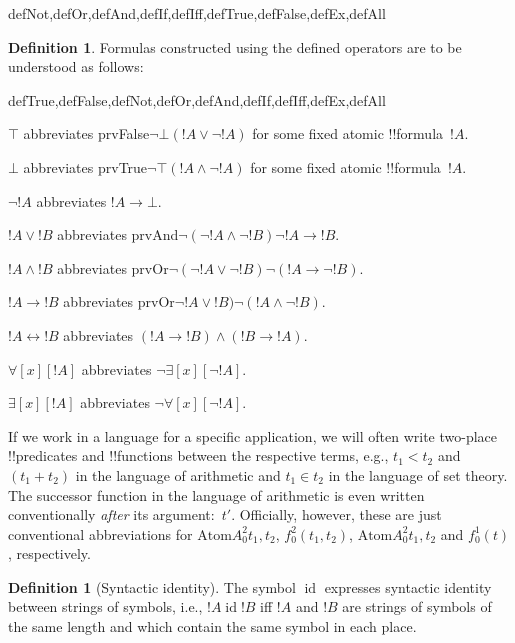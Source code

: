\documentclass[10pt,a4paper]{article}
\theoremstyle{plain}
\theoremstyle{definition}
\newtheorem{defn}[thm]{Definition}
\theoremstyle{remark}
\providecommand{\lif}{\mathbin{\rightarrow}}
\providecommand{\lforall}{\mathord{\forall}}
\providecommand{\lexists}{\mathord{\exists}}
\providecommand{\ltrue}{\top}
\providecommand{\lfalse}{\bot}
\providecommand{\Obj}{}
\providecommand{\iftag}[1]{#1}
\providecommand{\tagitem}[1]{\item[#1]}
\providecommand{\liff}{\mathbin{\leftrightarrow}}
\providecommand{\Atom}{\mathrm{Atom}}
\providecommand{\ident}{\operatorname{id}}
\providecommand{\iftag}{}
\begin{document}
\begin{tagblock}{defNot,defOr,defAnd,defIf,defIff,defTrue,defFalse,defEx,defAll}
\begin{defn}
Formulas constructed using the defined operators are to be understood
as follows:

\begin{tagenumerate}{defTrue,defFalse,defNot,defOr,defAnd,defIf,defIff,defEx,defAll}

\tagitem{defTrue}{$\ltrue$ abbreviates
  \iftag{prvFalse}{$\lnot\lfalse$}{$(!A \lor \lnot !A)$ for some
    fixed atomic !!{formula}~$!A$}.}{}

\tagitem{defFalse}{$\lfalse$ abbreviates
  \iftag{prvTrue}{$\lnot\ltrue$}{$(!A \land \lnot !A)$ for some
    fixed atomic !!{formula}~$!A$}.}{}

\tagitem{defNot}{$\lnot !A$ abbreviates $!A \lif \lfalse$.}{}

\tagitem{defOr}{$!A \lor !B$ abbreviates
  \iftag{prvAnd}{$\lnot(\lnot !A \land \lnot !B)$}{$\lnot !A \lif
    !B$}.}{}

\tagitem{defAnd}{$!A \land !B$ abbreviates
  \iftag{prvOr}{$\lnot(\lnot !A \lor \lnot !B)$}{$\lnot (!A \lif
    \lnot !B)$}.}{}

\tagitem{defIf}{$!A \lif !B$ abbreviates
  \iftag{prvOr}{$\lnot !A \lor !B)$}{$\lnot (!A \land \lnot !B)$}.}{}

\tagitem{defIff}{$!A \liff !B$ abbreviates $(!A \lif !B) \land (!B
  \lif !A)$.}{}

\tagitem{defAll}{$\lforall[x][!A]$ abbreviates $\lnot\lexists[x][\lnot !A]$.}{}

\tagitem{defEx}{$\lexists[x][!A]$ abbreviates $\lnot\lforall[x][\lnot !A]$.}{}
\end{tagenumerate}
\end{defn}
\end{tagblock}

If we work in a language for a specific application, we will often
write two-place !!{predicate}s and !!{function}s between the
respective terms, e.g., $t_1 < t_2$ and $(t_1 + t_2)$ in the language
of arithmetic and $t_1 \in t_2$ in the language of set theory.  The
successor function in the language of arithmetic is even written
conventionally \emph{after} its argument:~$t'$.  Officially, however,
these are just conventional abbreviations for $\Atom{\Obj A^2_0}{t_1, t_2}$,
$\Obj f^2_0(t_1, t_2)$, $\Atom{\Obj A^2_0}{t_1, t_2}$ and $f^1_0(t)$,
respectively.

\begin{defn}[Syntactic identity]
The symbol $\ident$ expresses syntactic identity between strings of
symbols, i.e., $!A \ident !B$ iff $!A$ and $!B$ are strings of symbols
of the same length and which contain the same symbol in each place.
\end{defn}
\end{document}
